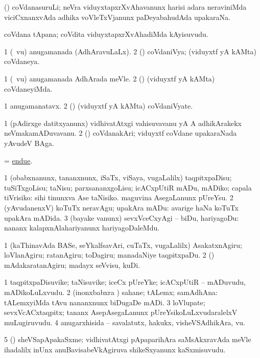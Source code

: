 \bentry
{}
\gl{\nA}
\bmng
(\viduyx) coVdanasuruLi; neVra viduyxtapxrXvAhavanunx harisi adara neraviniMda viciCxnanxvAda adhika voVleTxVjanunx paDeyabahudAda upakaraNa. 
\emng
\eentry

\bentry
{}
\gl{\nA}
\bmng
coVdana tApana; coVdita viduyxtapxrXvAhadiMda kAyisuvudu. 
\emng
\eentry

\bentry
{}
\gl{\gu}
\bmng
\bnum
\num{1} (\takaR\ \mo vu) anugamanada (AdhAravuLaLx). 
\num{2} (\Bwvi) coVdaniVya; (viduyxtf yA kAMta) coVdaneya. 
\enum
\emng
\eentry

\bentry
{}
\gl{\kirxvi}
\bmng
\bnum
\num{1} (\takaR\ \mo vu) anugamanada AdhArada meVle. 
\num{2} (\Bwvi) (viduyxtf yA kAMta) coVdaneyiMda. 
\enum
\emng
\eentry

\bentry
{}
\gl{\nA}
\bmng
\bnum
\num{1} anugamanatavx. 
\num{2} (\Bwvi) (viduyxtf yA kAMta) coVdaniVyate. 
\enum
\emng
\eentry

\bentry
{}
\gl{\nA}
\bmng
\bnum
\num{1} (pAdirxge datitxyanunx) vidhivatAtxgi vahisuvavanu yA A adhikArakekx neVmakamADuvavanu. 
\num{2} (\Bwvi) coVdanakAri; viduyxtf coVdane upakaraNada yAvudeV BAga. 
\enum
\emng
\eentry

\bentry
{}
\gl{\sakirx}
\bmng
= \hyperref{kandict_e.pdf}{E}{endue}{endue}. 
\emng
\eentry

\bentry
{}
\gl{\sakirx}
\bmng
\bnum
\num{1} (obabxnanunx, tananxnunx, iSaTx, viSaya, \mo vugaLalilx) taqpitxpaDisu; tuSiTxgoLisu; taNisu; parxsananxgoLisu; icACxpUtiR mADu, mADiko; capala tiVrisiko:  sihi tinunxva Ase taNisiko.  maguvina AsegaLanunx pUreYsu. 
\num{2} (yAvudanenxV) koTuTx neravAgu; upakAra mADu:  avarige haNa koTuTx upakAra mADida. 
\num{3} (bayake \mo vanunx) sevxVceCxyAgi -- biDu, hariyagoDu:  nananx kalapxnAlahariyanunx hariyagoDaleMdu. 
\enum
\emng

\noindent
\gl{\akirx}
\bmng
\bnum
\num{1} (kaThinavAda BASe, seYkalfsavAri, cuTaTx, \mo vugaLalilx) AsakatxnAgiru; loVlanAgiru; ratanAgiru; toDagiru; manadaNiye taqpitxpaDu. 
\num{2} (\AmA) mAdakaratanAgiru; madayx seVvisu, kuDi. 
\enum
\emng
\eentry

\bentry
{}
\gl{\nA}
\bmng
\bnum
\num{1} taqpitxpaDisuvike; taNisuvike; iceCx pUreYke; icACxpUtiR -- mADuvudu, mADikoLuLxvudu. 
\num{2} (inonxbabxra \vi) sahane; tALemx; samAdhAna:  tALemxyiMda tAvu nananxnunx biDugaDe mADi. 
\num{3} loVlupate; sevxVcACxtaqpitx; tananx AsepAsegaLanunx pUreYsikoLuLxvudaralelxV muLugiruvudu. 
\num{4} anugarxhisida -- savalatutx, hakukx, visheVSAdhikAra, \mo vu. 
\num{5} (\roVkAyx) sheVSapApakaSxme; vidhivatAtxgi pApaparihAra saMsAkxravAda meVle ihadalilx inUnx anuBavisabeVkAgiruva shikeSxyanunx kaSxmisuvudu. 
\enum
\emng

